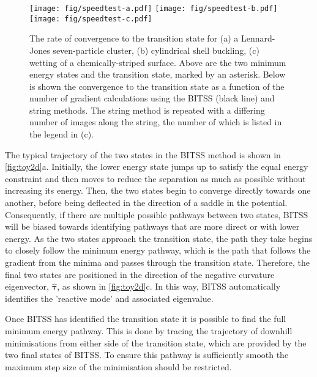 \documentclass[aps,prl,twocolumn,groupedaddress]{revtex4}
\begin{document}
\begin{figure*}[tb]
  \texttt{[image: fig/speedtest-a.pdf]}%
  \texttt{[image: fig/speedtest-b.pdf]}%
  \texttt{[image: fig/speedtest-c.pdf]}%
  \caption{\label{fig:speedtest}
    The rate of convergence to the transition state for (a) a Lennard-Jones seven-particle cluster, (b) cylindrical shell buckling, (c) wetting of a chemically-striped surface.
    Above are the two minimum energy states and the transition state, marked by an asterisk.
    Below is shown the convergence to the transition state as a function of the number of gradient calculations using the BITSS (black line) and string methods.
    The string method is repeated with a differing number of images along the string, the number of which is listed in the legend in (c).
  }
\end{figure*}

\topic The typical trajectory of the two states in the BITSS method is shown in \cref{fig:toy2d}a.
Initially, the lower energy state jumps up to satisfy the equal energy constraint and then moves to reduce the separation as much as possible without increasing its energy.
Then, the two states begin to converge directly towards one another, before being deflected in the direction of a saddle in the potential.
Consequently, if there are multiple possible pathways between two states, BITSS will be biased towards identifying pathways that are more direct or with lower energy.
As the two states approach the transition state, the path they take begins to closely follow the minimum energy pathway, which is the path that follows the gradient from the minima and passes through the transition state.
Therefore, the final two states are positioned in the direction of the negative curvature eigenvector, $\bm{\hat{\tau}}$, as shown in \cref{fig:toy2d}c.
In this way, BITSS automatically identifies the 'reactive mode' and associated eigenvalue.

\topic Once BITSS has identified the transition state it is possible to find the full minimum energy pathway.
This is done by tracing the trajectory of downhill minimisations from either side of the transition state, which are provided by the two final states of BITSS.
To ensure this pathway is sufficiently smooth the maximum step size of the minimisation should be restricted.
\end{document}
